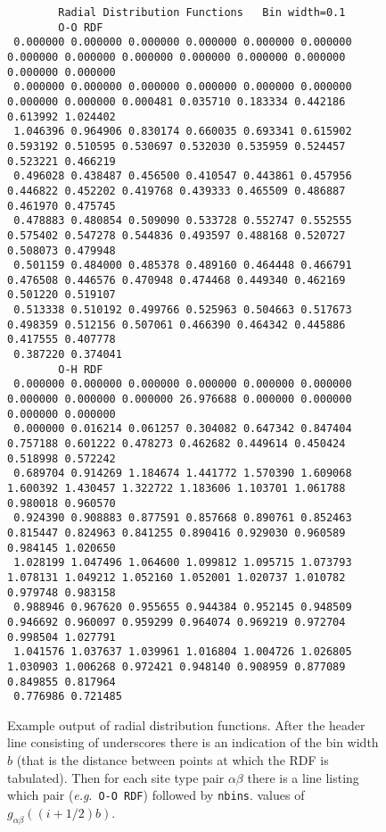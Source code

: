 \documentclass[twoside]{report}
\newcommand{\eg}{{\em e.g}.\ }
\begin{document}
\begin{figure}
\caption[Example output of radial distribution functions.]{Example
output of radial distribution functions. After the header line
consisting of underscores there is an indication of the bin width $b$
(that is the distance between points at which the RDF is tabulated).
Then for each site type pair $\alpha\beta$ there is a line listing
which pair (\eg {\tt O-O RDF}) followed by {\tt nbins}.  values of
$g_{\alpha\beta}((i+1/2)b)$.  }
\label{fig:rdf-output}
\begin{tiny}
\hrulefill
\begin{verbatim}
        Radial Distribution Functions   Bin width=0.1
        O-O RDF
 0.000000 0.000000 0.000000 0.000000 0.000000 0.000000 0.000000 0.000000 0.000000 0.000000 0.000000 0.000000 0.000000 0.000000
 0.000000 0.000000 0.000000 0.000000 0.000000 0.000000 0.000000 0.000000 0.000481 0.035710 0.183334 0.442186 0.613992 1.024402
 1.046396 0.964906 0.830174 0.660035 0.693341 0.615902 0.593192 0.510595 0.530697 0.532030 0.535959 0.524457 0.523221 0.466219
 0.496028 0.438487 0.456500 0.410547 0.443861 0.457956 0.446822 0.452202 0.419768 0.439333 0.465509 0.486887 0.461970 0.475745
 0.478883 0.480854 0.509090 0.533728 0.552747 0.552555 0.575402 0.547278 0.544836 0.493597 0.488168 0.520727 0.508073 0.479948
 0.501159 0.484000 0.485378 0.489160 0.464448 0.466791 0.476508 0.446576 0.470948 0.474468 0.449340 0.462169 0.501220 0.519107
 0.513338 0.510192 0.499766 0.525963 0.504663 0.517673 0.498359 0.512156 0.507061 0.466390 0.464342 0.445886 0.417555 0.407778
 0.387220 0.374041
        O-H RDF
 0.000000 0.000000 0.000000 0.000000 0.000000 0.000000 0.000000 0.000000 0.000000 26.976688 0.000000 0.000000 0.000000 0.000000
 0.000000 0.016214 0.061257 0.304082 0.647342 0.847404 0.757188 0.601222 0.478273 0.462682 0.449614 0.450424 0.518998 0.572242
 0.689704 0.914269 1.184674 1.441772 1.570390 1.609068 1.600392 1.430457 1.322722 1.183606 1.103701 1.061788 0.980018 0.960570
 0.924390 0.908883 0.877591 0.857668 0.890761 0.852463 0.815447 0.824963 0.841255 0.890416 0.929030 0.960589 0.984145 1.020650
 1.028199 1.047496 1.064600 1.099812 1.095715 1.073793 1.078131 1.049212 1.052160 1.052001 1.020737 1.010782 0.979748 0.983158
 0.988946 0.967620 0.955655 0.944384 0.952145 0.948509 0.946692 0.960097 0.959299 0.964074 0.969219 0.972704 0.998504 1.027791
 1.041576 1.037637 1.039961 1.016804 1.004726 1.026805 1.030903 1.006268 0.972421 0.948140 0.908959 0.877089 0.849855 0.817964
 0.776986 0.721485

\end{verbatim}
\end{tiny}
\end{figure}
\end{document}
